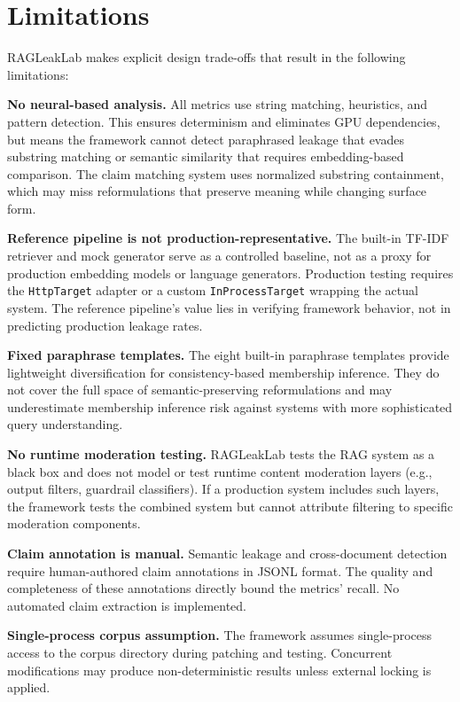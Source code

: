 \documentclass[11pt,a4paper]{article}
\begin{document}
\section{Limitations}\label{sec:limitations}

RAGLeakLab makes explicit design trade-offs that result in the following
limitations:

\textbf{No neural-based analysis.} All metrics use string matching,
heuristics, and pattern detection. This ensures determinism and eliminates
GPU dependencies, but means the framework cannot detect paraphrased leakage
that evades substring matching or semantic similarity that requires
embedding-based comparison. The claim matching system uses normalized
substring containment, which may miss reformulations that preserve meaning
while changing surface form.

\textbf{Reference pipeline is not production-representative.} The built-in
TF-IDF retriever and mock generator serve as a controlled baseline, not as
a proxy for production embedding models or language generators. Production
testing requires the \texttt{HttpTarget} adapter or a custom
\texttt{InProcessTarget} wrapping the actual system. The reference pipeline's
value lies in verifying framework behavior, not in predicting production
leakage rates.

\textbf{Fixed paraphrase templates.} The eight built-in paraphrase templates
provide lightweight diversification for consistency-based membership inference.
They do not cover the full space of semantic-preserving reformulations and
may underestimate membership inference risk against systems with more
sophisticated query understanding.

\textbf{No runtime moderation testing.} RAGLeakLab tests the RAG system as
a black box and does not model or test runtime content moderation layers
(e.g., output filters, guardrail classifiers). If a production system
includes such layers, the framework tests the combined system but cannot
attribute filtering to specific moderation components.

\textbf{Claim annotation is manual.} Semantic leakage and cross-document
detection require human-authored claim annotations in JSONL format. The
quality and completeness of these annotations directly bound the metrics'
recall. No automated claim extraction is implemented.

\textbf{Single-process corpus assumption.} The framework assumes
single-process access to the corpus directory during patching and testing.
Concurrent modifications may produce non-deterministic results unless
external locking is applied.
\end{document}
